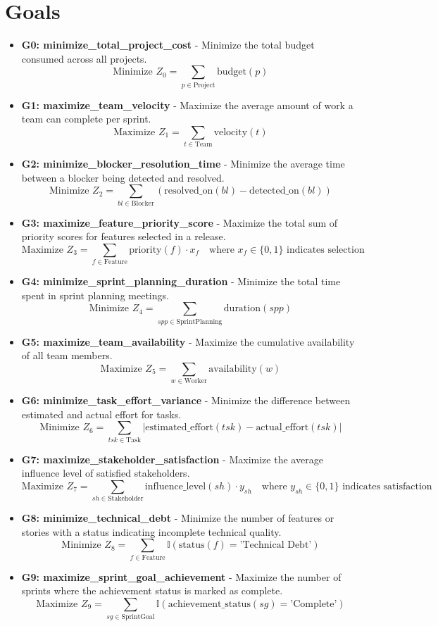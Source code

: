 \documentclass[11pt]{article}
\begin{document}
\section{Goals}
\begin{itemize}
    \item \textbf{G0: minimize\_total\_project\_cost} - Minimize the total budget consumed across all projects.
        \[ \text{Minimize } Z_0 = \sum_{p \in \text{Project}} \text{budget}(p) \]
    \item \textbf{G1: maximize\_team\_velocity} - Maximize the average amount of work a team can complete per sprint.
        \[ \text{Maximize } Z_1 = \sum_{t \in \text{Team}} \text{velocity}(t) \]
    \item \textbf{G2: minimize\_blocker\_resolution\_time} - Minimize the average time between a blocker being detected and resolved.
        \[ \text{Minimize } Z_2 = \sum_{bl \in \text{Blocker}} (\text{resolved\_on}(bl) - \text{detected\_on}(bl)) \]
    \item \textbf{G3: maximize\_feature\_priority\_score} - Maximize the total sum of priority scores for features selected in a release.
        \[ \text{Maximize } Z_3 = \sum_{f \in \text{Feature}} \text{priority}(f) \cdot x_f \quad \text{where } x_f \in \{0,1\} \text{ indicates selection} \]
    \item \textbf{G4: minimize\_sprint\_planning\_duration} - Minimize the total time spent in sprint planning meetings.
        \[ \text{Minimize } Z_4 = \sum_{spp \in \text{SprintPlanning}} \text{duration}(spp) \]
    \item \textbf{G5: maximize\_team\_availability} - Maximize the cumulative availability of all team members.
        \[ \text{Maximize } Z_5 = \sum_{w \in \text{Worker}} \text{availability}(w) \]
    \item \textbf{G6: minimize\_task\_effort\_variance} - Minimize the difference between estimated and actual effort for tasks.
        \[ \text{Minimize } Z_6 = \sum_{tsk \in \text{Task}} | \text{estimated\_effort}(tsk) - \text{actual\_effort}(tsk) | \]
    \item \textbf{G7: maximize\_stakeholder\_satisfaction} - Maximize the average influence level of satisfied stakeholders.
        \[ \text{Maximize } Z_7 = \sum_{sh \in \text{Stakeholder}} \text{influence\_level}(sh) \cdot y_{sh} \quad \text{where } y_{sh} \in \{0,1\} \text{ indicates satisfaction} \]
    \item \textbf{G8: minimize\_technical\_debt} - Minimize the number of features or stories with a status indicating incomplete technical quality.
        \[ \text{Minimize } Z_8 = \sum_{f \in \text{Feature}} \mathbb{I}(\text{status}(f) = \text{'Technical Debt'}) \]
    \item \textbf{G9: maximize\_sprint\_goal\_achievement} - Maximize the number of sprints where the achievement status is marked as complete.
        \[ \text{Maximize } Z_9 = \sum_{sg \in \text{SprintGoal}} \mathbb{I}(\text{achievement\_status}(sg) = \text{'Complete'}) \]
\end{itemize}
\end{document}
